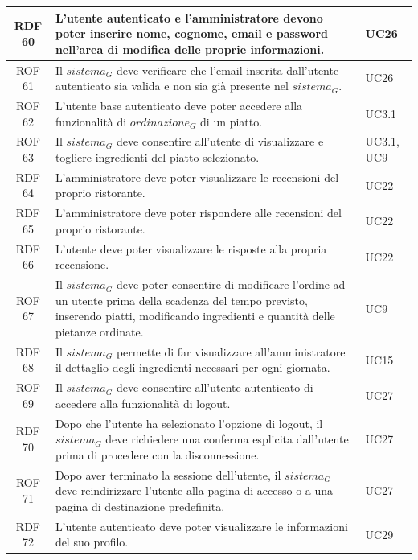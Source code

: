 \documentclass[12pt, oneside]{article}
\begin{document}
\begin{longtable}{|c|p{14cm}|p{2cm}|}
    RDF 60 & L’utente autenticato e l’amministratore devono poter inserire nome, cognome, email e password nell’area di modifica delle proprie informazioni.  & UC26  \\
    \hline
    ROF 61 & Il $\textit{sistema}_G$ deve verificare che l'email inserita dall'utente autenticato sia valida e non sia già presente nel $\textit{sistema}_G$.  & UC26  \\
    \hline
    ROF 62 & L'utente base autenticato deve poter accedere alla funzionalità di $\textit{ordinazione}_G$ di un piatto.  & UC3.1  \\
    \hline
    ROF 63 & Il $\textit{sistema}_G$ deve consentire all'utente di visualizzare e togliere ingredienti del piatto selezionato.  & UC3.1, UC9  \\
    \hline
    RDF 64 & L'amministratore deve poter visualizzare le recensioni del proprio ristorante. & UC22 \\ 
    \hline
    RDF 65 & L'amministratore deve poter rispondere alle recensioni del proprio ristorante. & UC22 \\
    \hline
    RDF 66 & L'utente deve poter visualizzare le risposte alla propria recensione. & UC22 \\
    \hline
    ROF 67 & Il $\textit{sistema}_G$ deve poter consentire di modificare l'ordine ad un utente prima della scadenza del tempo previsto, inserendo piatti, modificando ingredienti e quantità delle pietanze ordinate. & UC9 \\
    \hline
    RDF 68 & Il $\textit{sistema}_G$ permette di far visualizzare all'amministratore il dettaglio degli ingredienti necessari per ogni giornata. & UC15 \\
    \hline
    ROF 69 & Il $\textit{sistema}_G$ deve consentire all'utente autenticato di accedere alla funzionalità di logout. & UC27 \\
    \hline
    RDF 70 & Dopo che l'utente ha selezionato l'opzione di logout, il $\textit{sistema}_G$ deve richiedere una conferma esplicita dall'utente prima di procedere con la disconnessione. & UC27 \\ 
    \hline
    ROF 71 & Dopo aver terminato la sessione dell'utente, il $\textit{sistema}_G$ deve reindirizzare l'utente alla pagina di accesso o a una pagina di destinazione predefinita. & UC27 \\
    \hline
    RDF 72 & L'utente autenticato deve poter visualizzare le informazioni del suo profilo. & UC29 \\ 
    \hline


\end{longtable}
\end{document}
